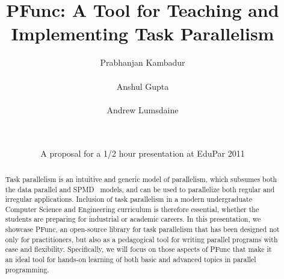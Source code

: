 \documentclass[9pt,twocolumn,letter]{article}
\begin{document}
\title{PFunc: A Tool for Teaching and Implementing Task Parallelism}

\date{A proposal for a 1/2 hour presentation at EduPar 2011}

\author{
  \alignauthor Prabhanjan Kambadur\\
  \\
  \alignauthor Anshul Gupta\\
  \\
  \alignauthor Andrew Lumsdaine\\
  \\
  \\
}

\maketitle

\begin{abstract} 
Task parallelism is an intuitive and generic model of parallelism, which
subsumes both the data parallel and SPMD~\cite{darema2001} models, and can be
used to parallelize both regular and irregular applications.
%
Inclusion of task parallelism in a modern undergraduate Computer Science and
Engineering curriculum is therefore essential, whether the students are
preparing for industrial or academic careers.
%
In this presentation, we showcase PFunc, an open-source library for
task parallelism that has been designed not only for practitioners, 
but also as
a pedagogical tool for writing parallel programs with ease and flexibility.
%
Specifically, we will focus on those aspects of PFunc that make it an ideal 
tool for hands-on
learning of both basic and advanced topics in parallel programming.
\end{abstract}
\end{document}

